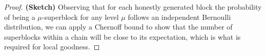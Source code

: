 \begin{proof} \textbf{(Sketch)}
Observing that for each honestly generated block the probability of being a
$\mu$-superblock for any level $\mu$ follows an independent Bernoulli
distribution, we can apply a Chernoff bound to show that the number of
superblocks within a chain will be close to its expectation, which is what
is required for local goodness.
\Qed
\end{proof}
